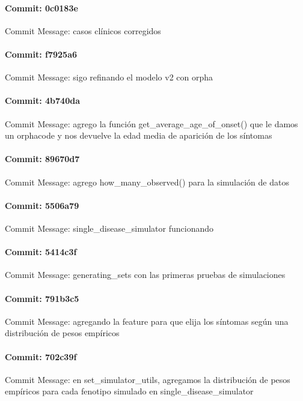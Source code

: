 \documentclass{article}
\begin{document}
\paragraph{Commit: 0c0183e}
Commit Message: casos clínicos corregidos

\paragraph{Commit: f7925a6}
Commit Message: sigo refinando el modelo v2 con orpha

\paragraph{Commit: 4b740da}
Commit Message: agrego la función get_average_age_of_onset() que le damos un orphacode y nos devuelve la edad media de aparición de los síntomas

\paragraph{Commit: 89670d7}
Commit Message: agrego how_many_observed() para la simulación de datos

\paragraph{Commit: 5506a79}
Commit Message: single_disease_simulator funcionando

\paragraph{Commit: 5414c3f}
Commit Message: generating_sets con las primeras pruebas de simulaciones

\paragraph{Commit: 791b3c5}
Commit Message: agregando la feature para que elija los síntomas según una distribución de pesos empíricos

\paragraph{Commit: 702c39f}
Commit Message: en set_simulator_utils, agregamos la distribución de pesos empíricos para cada fenotipo simulado en single_disease_simulator

\end{document}
